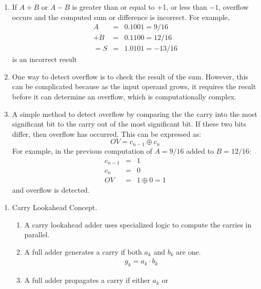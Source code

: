 \documentclass[times, twocolumn, 10pt]{article}
\begin{document}
\begin{enumerate}
\begin{enumerate}
\begin{enumerate}
\begin{enumerate}
          \item If $A + B$ or $ A - B$ is greater than or equal to +1, or
            less than $-1$,
	    overflow occurs and the computed sum or difference is
            incorrect. For example, 
	    \begin{eqnarray*}
	      A  & = & 0.1001 =  9/16 \\
	      + B  & = & 0.1100 =  12/16 \\
	      = S  & = & 1.0101 =  -13/16 
	    \end{eqnarray*}
	    is an incorrect result
          \item One way to detect overflow is to check the result
            of the sum. However,
            this can be complicated because as the input operand grows,
            it requires the result before it can determine an
            overflow, which is computationally complex.
          \item A simple method to detect overflow by comparing the
            the carry into the
            most significant bit
	    to the carry out of the most significant bit. If these two
            bits differ, 
	    then overflow has occurred. This can be expressed as:
	    \[  OV = c_{n-1} \oplus c_{n} \] 
	    For example, in the previous computation of 
            $A =  9/16$ added to $B = 12/16$:
	    \begin{eqnarray*}
	      c_{n-1} & = & 1 \\
	      c_{n}   & = & 0 \\
	      OV      & = & 1 \oplus 0 = 1 
	    \end{eqnarray*}
	    and overflow is detected. 
      \end{enumerate}
    \end{enumerate}
  \end{enumerate}
  \begin{enumerate}
  \item Carry Lookahead Concept. 
    \begin{enumerate}
    \item A carry lookahead adder uses specialized logic to compute 
      the carries in parallel. 
    \item A full adder generates a carry if both $a_{k}$ and $b_{k}$
      are one. 
      \begin{eqnarray*}
	g_{k} = a_{k} \cdot b_{k}      
      \end{eqnarray*}
    \item A full adder propagates a carry if either $a_{k}$ or

\end{enumerate}
\end{enumerate}
\end{enumerate}
\end{document}
